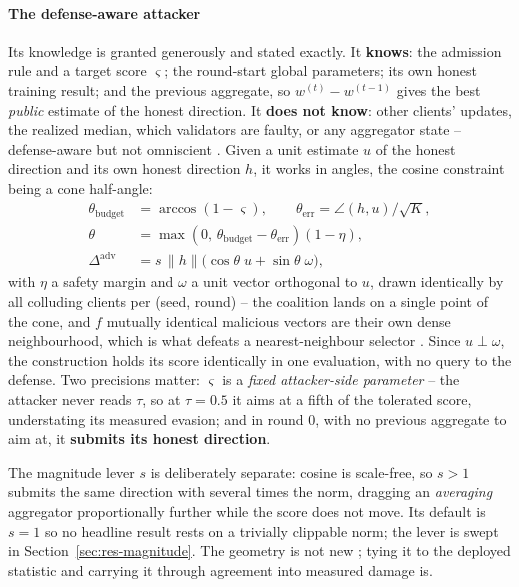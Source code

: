 \paragraph{The defense-aware attacker}
Its knowledge is granted generously and stated exactly. It
\textbf{knows}: the admission rule and a target score $\varsigma$; the
round-start global parameters; its own honest training result; and the
previous aggregate, so $w^{(t)}-w^{(t-1)}$ gives the best \emph{public}
estimate of the honest direction. It \textbf{does not know}: other
clients' updates, the realized median, which validators are faulty, or
any aggregator state -- defense-aware but not omniscient
\cite{fang2020,shejwalkar2021}. Given a unit estimate $u$ of the honest
direction and its own honest direction $h$, it works in angles, the
cosine constraint being a cone half-angle:
\begin{align}
\theta_{\mathrm{budget}} &= \arccos(1-\varsigma), \qquad
\theta_{\mathrm{err}} = \angle(h,u)\big/\sqrt{K}, \nonumber\\
\theta &= \max\!\left(0,\, \theta_{\mathrm{budget}}-\theta_{\mathrm{err}}\right)(1-\eta), \nonumber\\
\Delta^{\mathrm{adv}} &= s\,\lVert h\rVert\bigl(\cos\theta\; u + \sin\theta\; \omega\bigr),
\label{eq:adaptive}
\end{align}
with $\eta$ a safety margin and $\omega$ a unit vector orthogonal to
$u$, drawn identically by all colluding clients per (seed, round) -- the
coalition lands on a single point of the cone, and $f$ mutually
identical malicious vectors are their own dense neighbourhood, which is
what defeats a nearest-neighbour selector \cite{blanchard2017}. Since
$u \perp \omega$, the construction holds its score identically in one
evaluation, with no query to the defense. Two precisions matter:
$\varsigma$ is a \emph{fixed attacker-side parameter} -- the attacker
never reads $\tau$, so at $\tau=0.5$ it aims at a fifth of the tolerated
score, understating its measured evasion; and in round $0$, with no
previous aggregate to aim at, it \textbf{submits its honest direction}.

The magnitude lever $s$ is deliberately separate: cosine is scale-free,
so $s>1$ submits the same direction with several times the norm,
dragging an \emph{averaging} aggregator proportionally further while the
score does not move. Its default is $s=1$ so no headline result rests on
a trivially clippable norm; the lever is swept in
Section~\ref{sec:res-magnitude}. The geometry is not new
\cite{baruch2019,xie2019,shejwalkar2021}; tying it to the deployed
statistic and carrying it through agreement into measured damage is.
